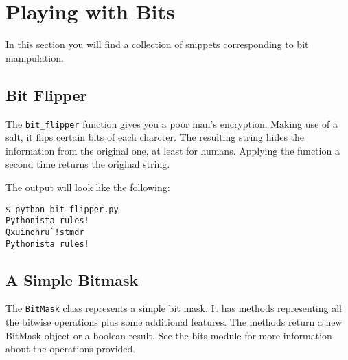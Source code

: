 
\section{Playing with Bits}

In this section you will find a collection of snippets corresponding to bit manipulation.


\subsection{Bit Flipper}

The \lstinline{bit_flipper} function gives you a poor man's encryption.
Making use of a salt, it flips certain bits of each charcter.
The resulting string hides the information from the original one, at least for humans.
Applying the function a second time returns the original string.



The output will look like the following:

\begin{lstlisting}[caption=Output of the bit flipper]
$ python bit_flipper.py
Pythonista rules!
Qxuinohru`!stmdr 
Pythonista rules!
\end{lstlisting}


\subsection{A Simple Bitmask}

The \lstinline{BitMask} class represents a simple bit mask.
It has methods representing all the bitwise operations plus some additional features.
The methods return a new BitMask object or a boolean result.
See the bits module for more information about the operations provided.


